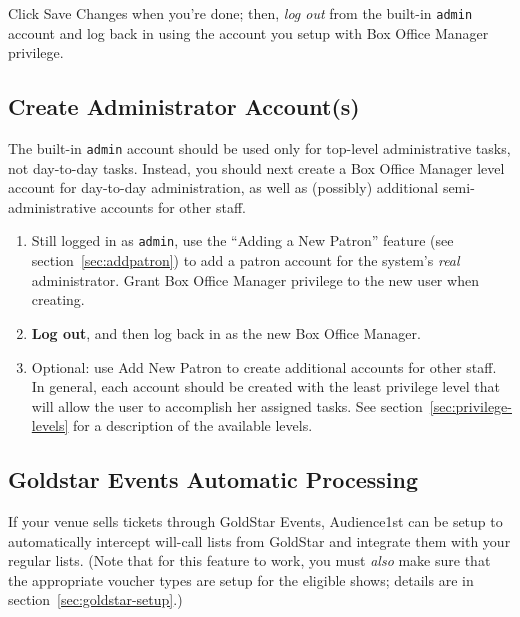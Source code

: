 Click Save Changes when
you're done; then, \emph{log out} from the built-in \verb+admin+
account and log back in using the account you setup with Box Office
Manager privilege.

\subsection{Create Administrator Account(s)}

The built-in \verb+admin+ account should be used only for top-level
administrative tasks, not day-to-day tasks.  Instead, you should next
create a Box Office Manager level account for day-to-day
administration, as well as (possibly) additional semi-administrative
accounts for other staff.

\begin{enumerate}
\item Still logged in as \verb+admin+,  use the
``Adding a New Patron'' feature (see section~\ref{sec:addpatron}) to add
a patron account for the system's \emph{real} administrator.  Grant
Box Office Manager privilege to the new user when creating.
\item \textbf{Log out}, and then log back in as the new Box Office
  Manager.
\item Optional: use Add New Patron to create additional accounts for
  other staff.  In general, each account should be created with the
  least privilege level that will allow the user to accomplish her
  assigned tasks.  See section~\ref{sec:privilege-levels} for a
  description of the available levels.
\end{enumerate}

\subsection{Goldstar Events Automatic Processing}

If your venue sells tickets through GoldStar Events, Audience1st can be
setup to automatically intercept will-call lists from GoldStar and
integrate them with your regular lists.  (Note that for this feature to
work, you must \emph{also} make sure that the appropriate voucher types
are setup for the eligible shows; details are in
section~\ref{sec:goldstar-setup}.) 

